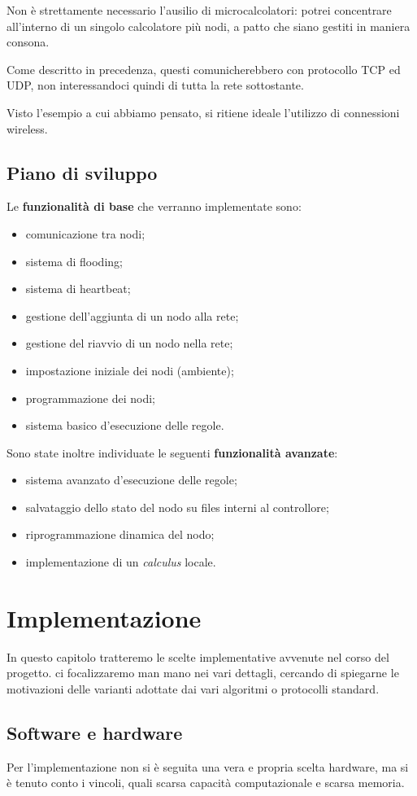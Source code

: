\documentclass[italian]{memoir}
\begin{document}
Non è strettamente necessario l'ausilio di microcalcolatori: potrei concentrare
	   all'interno di un singolo calcolatore più nodi, a patto che siano gestiti in
	   maniera
	   consona. 

Come descritto in precedenza, questi comunicherebbero con protocollo TCP ed UDP,
	   non interessandoci quindi di tutta la rete sottostante.

Visto l'esempio a cui abbiamo pensato, si ritiene ideale l'utilizzo di connessioni
	   wireless.
\section{Piano di sviluppo}
Le \textbf{funzionalità di base} che verranno implementate sono:
\begin{itemize}
	\item comunicazione tra nodi;
	\item sistema di flooding;
	\item sistema di heartbeat;
	\item gestione dell'aggiunta di un nodo alla rete;
	\item gestione del riavvio di un nodo nella rete;
	\item impostazione iniziale dei nodi (ambiente);
	\item programmazione dei nodi;
	\item sistema basico d'esecuzione delle regole.
\end{itemize}
Sono state inoltre individuate le seguenti \textbf{funzionalità avanzate}:
\begin{itemize}
	\item sistema avanzato d'esecuzione delle regole;
	\item salvataggio dello stato del nodo su files interni al controllore;
	\item riprogrammazione dinamica del nodo;
	\item implementazione di un \emph{calculus} locale.
\end{itemize}

\chapter{Implementazione}
In questo capitolo tratteremo le scelte implementative avvenute nel corso del progetto. ci focalizzaremo man mano nei vari dettagli, cercando di spiegarne le motivazioni delle varianti adottate dai vari algoritmi o protocolli standard.

\section{Software e hardware}
Per l'implementazione non si è seguita una vera e propria scelta hardware, ma si è tenuto conto i vincoli, quali scarsa capacità computazionale e scarsa memoria.
\end{document}
